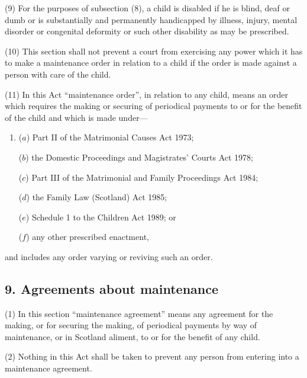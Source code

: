 \documentclass[12pt,a4paper]{article}
\begin{document}
(9) For the purposes of subsection (8), a child is disabled if he is blind, deaf or dumb or is substantially and permanently handicapped by illness, injury, mental disorder or congenital deformity or such other disability as may be prescribed.

(10) This section shall not prevent a court from exercising any power which it has to make a maintenance order in relation to a child if the order is made against a person with care of the child.

(11) In this Act “maintenance order”, in relation to any child, means an order which requires the making or securing of periodical payments to or for the benefit of the child and which is made under—
\begin{enumerate}\item[]
($a$) Part II of the Matrimonial Causes Act 1973;

($b$) the Domestic Proceedings and Magistrates' Courts Act 1978;

($c$) Part III of the Matrimonial and Family Proceedings Act 1984;

($d$) the Family Law (Scotland) Act 1985;

($e$) Schedule 1 to the Children Act 1989; or

($f$) any other prescribed enactment,
\end{enumerate}
and includes any order varying or reviving such an order.


\subsection{9. Agreements about maintenance}

(1) In this section “maintenance agreement” means any agreement for the making, or for securing the making, of periodical payments by way of maintenance, or in Scotland aliment, to or for the benefit of any child.

(2) Nothing in this Act shall be taken to prevent any person from entering into a maintenance agreement.
\end{document}
